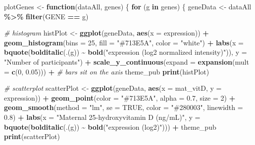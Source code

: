 \documentclass[
]{article}
\newenvironment{Shaded}{\begin{snugshade}}{\end{snugshade}}
\newcommand{\AttributeTok}[1]{\textcolor[rgb]{0.13,0.29,0.53}{#1}}
\newcommand{\CommentTok}[1]{\textcolor[rgb]{0.56,0.35,0.01}{\textit{#1}}}
\newcommand{\ConstantTok}[1]{\textcolor[rgb]{0.56,0.35,0.01}{#1}}
\newcommand{\ControlFlowTok}[1]{\textcolor[rgb]{0.13,0.29,0.53}{\textbf{#1}}}
\newcommand{\DecValTok}[1]{\textcolor[rgb]{0.00,0.00,0.81}{#1}}
\newcommand{\FloatTok}[1]{\textcolor[rgb]{0.00,0.00,0.81}{#1}}
\newcommand{\FunctionTok}[1]{\textcolor[rgb]{0.13,0.29,0.53}{\textbf{#1}}}
\newcommand{\NormalTok}[1]{#1}
\newcommand{\OtherTok}[1]{\textcolor[rgb]{0.56,0.35,0.01}{#1}}
\newcommand{\SpecialCharTok}[1]{\textcolor[rgb]{0.81,0.36,0.00}{\textbf{#1}}}
\newcommand{\StringTok}[1]{\textcolor[rgb]{0.31,0.60,0.02}{#1}}
\begin{document}
\begin{Shaded}
\begin{Highlighting}[]
\NormalTok{plotGenes }\OtherTok{\textless{}{-}} \ControlFlowTok{function}\NormalTok{(dataAll, genes) \{}
  \ControlFlowTok{for}\NormalTok{ (g }\ControlFlowTok{in}\NormalTok{ genes) \{}
\NormalTok{    geneData }\OtherTok{\textless{}{-}}\NormalTok{ dataAll }\SpecialCharTok{\%\textgreater{}\%} \FunctionTok{filter}\NormalTok{(GENE }\SpecialCharTok{==}\NormalTok{ g)}

    \CommentTok{\# histogram}
\NormalTok{    histPlot }\OtherTok{\textless{}{-}} \FunctionTok{ggplot}\NormalTok{(geneData, }\FunctionTok{aes}\NormalTok{(}\AttributeTok{x =}\NormalTok{ expression)) }\SpecialCharTok{+}
      \FunctionTok{geom\_histogram}\NormalTok{(}\AttributeTok{bins =} \DecValTok{25}\NormalTok{, }\AttributeTok{fill =} \StringTok{"\#713E5A"}\NormalTok{, }\AttributeTok{color =} \StringTok{"white"}\NormalTok{) }\SpecialCharTok{+}
      \FunctionTok{labs}\NormalTok{(}\AttributeTok{x =} \FunctionTok{bquote}\NormalTok{(}\FunctionTok{bolditalic}\NormalTok{(.(g)) }\SpecialCharTok{\textasciitilde{}}
                        \FunctionTok{bold}\NormalTok{(}\StringTok{"expression (log2 normalized intensity)"}\NormalTok{)),}
           \AttributeTok{y =} \StringTok{"Number of participants"}\NormalTok{) }\SpecialCharTok{+}
      \FunctionTok{scale\_y\_continuous}\NormalTok{(}\AttributeTok{expand =} \FunctionTok{expansion}\NormalTok{(}\AttributeTok{mult =} \FunctionTok{c}\NormalTok{(}\DecValTok{0}\NormalTok{, }\FloatTok{0.05}\NormalTok{))) }\SpecialCharTok{+}  \CommentTok{\# bars sit on the axis}
\NormalTok{      theme\_pub}
    \FunctionTok{print}\NormalTok{(histPlot)}

    \CommentTok{\# scatterplot}
\NormalTok{    scatterPlot }\OtherTok{\textless{}{-}} \FunctionTok{ggplot}\NormalTok{(geneData, }\FunctionTok{aes}\NormalTok{(}\AttributeTok{x =}\NormalTok{ mat\_vitD, }\AttributeTok{y =}\NormalTok{ expression)) }\SpecialCharTok{+}
      \FunctionTok{geom\_point}\NormalTok{(}\AttributeTok{color =} \StringTok{"\#713E5A"}\NormalTok{, }\AttributeTok{alpha =} \FloatTok{0.7}\NormalTok{, }\AttributeTok{size =} \DecValTok{2}\NormalTok{) }\SpecialCharTok{+}
      \FunctionTok{geom\_smooth}\NormalTok{(}\AttributeTok{method =} \StringTok{"lm"}\NormalTok{, }\AttributeTok{se =} \ConstantTok{TRUE}\NormalTok{, }\AttributeTok{color =} \StringTok{"\#280003"}\NormalTok{, }\AttributeTok{linewidth =} \FloatTok{0.8}\NormalTok{) }\SpecialCharTok{+}
      \FunctionTok{labs}\NormalTok{(}\AttributeTok{x =} \StringTok{"Maternal 25{-}hydroxyvitamin D (ng/mL)"}\NormalTok{,}
           \AttributeTok{y =} \FunctionTok{bquote}\NormalTok{(}\FunctionTok{bolditalic}\NormalTok{(.(g)) }\SpecialCharTok{\textasciitilde{}} \FunctionTok{bold}\NormalTok{(}\StringTok{"expression (log2)"}\NormalTok{))) }\SpecialCharTok{+}
\NormalTok{      theme\_pub}
    \FunctionTok{print}\NormalTok{(scatterPlot)}


\end{Highlighting}
\end{Shaded}
\end{document}
